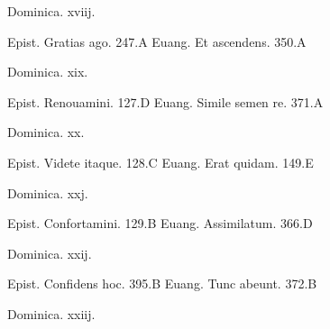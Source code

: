 \documentclass[a5paper,10pt]{book}
\begin{document}
\begin{multicols}{2}
\newline \vspace{-1.75em}
\begin{center}
\color{red} Dominica. xviij.
\end{center}
\vspace{-.75em}
\par \noindent Epist. Gratias ago. \hfill 247.A
\newline Euang. Et ascendens. \hfill 350.A
\newline \vspace{-1.75em}
\begin{center}
\color{red} Dominica. xix.
\end{center}
\vspace{-.75em}
\par \noindent Epist. Renouamini. \hfill 127.D
\newline Euang. Simile semen re. \hfill 371.A
\newline \vspace{-1.75em}
\begin{center}
\color{red} Dominica. xx.
\end{center}
\vspace{-.75em}
\par \noindent Epist. Videte itaque. \hfill 128.C
\newline Euang. Erat quidam. \hfill 149.E
\newline \vspace{-1.75em}
\begin{center}
\color{red} Dominica. xxj.
\end{center}
\vspace{-.75em}
\par \noindent Epist. Confortamini. \hfill 129.B
\newline Euang. Assimilatum. \hfill 366.D
\newline \vspace{-1.75em}
\begin{center}
\color{red} Dominica. xxij.
\end{center}
\vspace{-.75em}
\par \noindent Epist. Confidens hoc. \hfill 395.B
\newline Euang. Tunc abeunt. \hfill 372.B
\newline \vspace{-1.75em}
\begin{center}
\color{red} Dominica. xxiij.
\end{center}
\vspace{-.75em}

\end{multicols}
\end{document}
